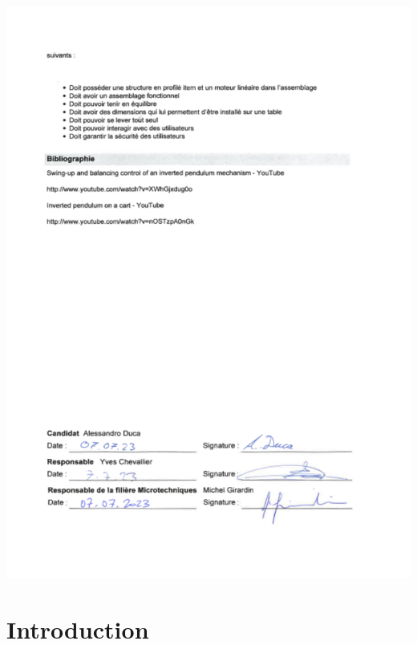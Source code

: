 \documentclass[
    iai, %
    mi, %
]{heig-tb}
\begin{document}
\includegraphics[width = \textwidth]{assets/figures/DescriptifArriere.svg}

\begin{abstract}
  
\end{abstract}

\clearemptydoublepage
{
  \tableofcontents
  \let\cleardoublepage\clearpage
  \listoffigures
  \let\cleardoublepage\clearpage
  \listoftables
}

\printnomenclature
\clearemptydoublepage
{}

\mainmatter
\chapter{Introduction}

\end{document}
